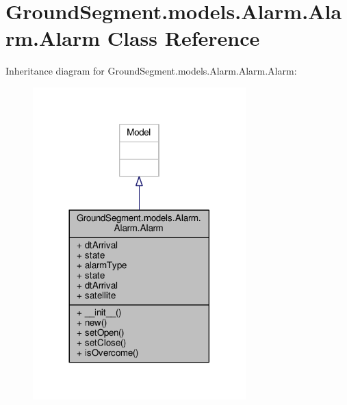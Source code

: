 \hypertarget{class_ground_segment_1_1models_1_1_alarm_1_1_alarm_1_1_alarm}{}\section{Ground\+Segment.\+models.\+Alarm.\+Alarm.\+Alarm Class Reference}
\label{class_ground_segment_1_1models_1_1_alarm_1_1_alarm_1_1_alarm}


Inheritance diagram for Ground\+Segment.\+models.\+Alarm.\+Alarm.\+Alarm\+:\nopagebreak
\begin{figure}[H]
\begin{center}
\leavevmode
\includegraphics[width=233pt]{class_ground_segment_1_1models_1_1_alarm_1_1_alarm_1_1_alarm__inherit__graph}
\end{center}
\end{figure}


